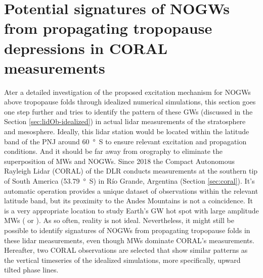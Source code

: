 \section{Potential signatures of NOGWs from propagating tropopause depressions in CORAL measurements}
\label{sec:lidOb-coral}

Ater a detailed investigation of the proposed excitation mechanism for NOGWs above tropopause folds through idealized numerical simulations, this section goes one step further and tries to identify the pattern of these GWs (discussed in the Section \ref{sec:lidOb-idealized}) in actual lidar measurements of the stratosphere and mesosphere. Ideally, this lidar station would be located within the latitude band of the PNJ around \SI{60}{\degree S} to ensure relevant excitation and propagation conditions. And it should be far away from orography to eliminate the superposition of MWs and NOGWs. Since 2018 the Compact Autonomous Rayleigh Lidar (CORAL) of the DLR conducts measurements at the southern tip of South America (\SI{53.79}{\degree S}) in Río Grande, Argentina (Section \ref{sec:coral}). It's automatic operation provides a unique dataset of observations within the relevant latitude band, but its proximity to the Andes Mountains is not a coincidence. It is a very appropriate location to study Earth's GW hot spot with large amplitude MWs (\cite[]{rapp_southtrac-gw_2021} or \cite[]{reichert_highcadence_2021}). As so often, reality is not ideal. Nevertheless, it might still be possible to identify signatures of NOGWs from propagating tropopause folds in these lidar measurements, even though MWs dominate CORAL's measurements. Hereafter, two CORAL observations are selected that show similar patterns as the vertical timeseries of the idealized simulations, more specifically, upward tilted phase lines. 

